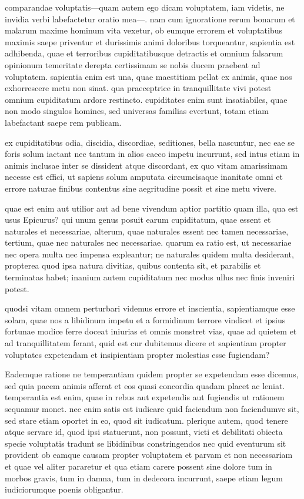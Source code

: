  comparandae voluptatis—quam autem ego dicam voluptatem, iam videtis, ne invidia verbi labefactetur oratio mea—. nam cum ignoratione rerum bonarum et malarum maxime hominum vita vexetur, ob eumque errorem et voluptatibus maximis saepe priventur et durissimis animi doloribus torqueantur, sapientia est adhibenda, quae et terroribus cupiditatibusque detractis et omnium falsarum opinionum temeritate derepta certissimam se nobis ducem praebeat ad voluptatem. sapientia enim est una, quae maestitiam pellat ex animis, quae nos exhorrescere metu non sinat. qua praeceptrice in tranquillitate vivi potest omnium cupiditatum ardore restincto. cupiditates enim sunt insatiabiles, quae non modo singulos homines, sed universas familias evertunt, totam etiam labefactant saepe rem publicam.

 ex cupiditatibus odia, discidia, discordiae, seditiones, bella nascuntur, nec eae se foris solum iactant nec tantum in alios caeco impetu incurrunt, sed intus etiam in animis inclusae inter se dissident atque discordant, ex quo vitam amarissimam necesse est effici, ut sapiens solum amputata circumcisaque inanitate omni et errore naturae finibus contentus sine aegritudine possit et sine metu vivere.

 quae est enim aut utilior aut ad bene vivendum aptior partitio quam illa, qua est usus Epicurus? qui unum genus posuit earum cupiditatum, quae essent et naturales et necessariae, alterum, quae naturales essent nec tamen necessariae, tertium, quae nec naturales nec necessariae. quarum ea ratio est, ut necessariae nec opera multa nec impensa expleantur; ne naturales quidem multa desiderant, propterea quod ipsa natura divitias, quibus contenta sit, et parabilis et terminatas habet; inanium autem cupiditatum nec modus ullus nec finis inveniri potest.

 quodsi vitam omnem perturbari videmus errore et inscientia, sapientiamque esse solam, quae nos a libidinum impetu et a formidinum terrore vindicet et ipsius fortunae modice ferre doceat iniurias et omnis monstret vias, quae ad quietem et ad tranquillitatem ferant, quid est cur dubitemus dicere et sapientiam propter voluptates expetendam et insipientiam propter molestias esse fugiendam?

 Eademque ratione ne temperantiam quidem propter se expetendam esse dicemus, sed quia pacem animis afferat et eos quasi concordia quadam placet ac leniat. temperantia est enim, quae in rebus aut expetendis aut fugiendis ut rationem sequamur monet. nec enim satis est iudicare quid faciendum non faciendumve sit, sed stare etiam oportet in eo, quod sit iudicatum. plerique autem, quod tenere atque servare id, quod ipsi statuerunt, non possunt, victi et debilitati obiecta specie voluptatis tradunt se libidinibus constringendos nec quid eventurum sit provident ob eamque causam propter voluptatem et parvam et non necessariam et quae vel aliter pararetur et qua etiam carere possent sine dolore tum in morbos gravis, tum in damna, tum in dedecora incurrunt, saepe etiam legum iudiciorumque poenis obligantur.

